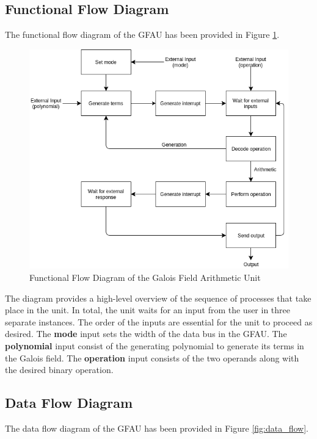 \documentclass[12pt]{extarticle}
\newcommand{\team}{Galois Field Arithmetic Unit}
\begin{document}
        \subsection{Functional Flow Diagram} The functional flow diagram of the
        GFAU has been provided in Figure \ref{fig:functional_flow}.

        \begin{figure}[ht]
            \begin{center}
                \includegraphics[width=1\textwidth]{functional_flow.png}
                \caption{Functional Flow Diagram of the \team~}
                \label{fig:functional_flow}
            \end{center}
        \end{figure}

        The diagram provides a high-level overview of the sequence of processes
        that take place in the unit. In total, the unit waits for an input from
        the user in three separate instances. The order of the inputs are
        essential for the unit to proceed as desired. The \textbf{mode} input
        sets the width of the data bus in the GFAU. The \textbf{polynomial}
        input consist of the generating polynomial to generate its terms in the
        Galois field. The \textbf{operation} input consists of the two operands
        along with the desired binary operation.
        \newpage

        \subsection{Data Flow Diagram} The data flow diagram of the GFAU has
        been provided in Figure \ref{fig:data_flow}.
\end{document}
